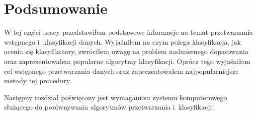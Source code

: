 \documentclass[../thesis.tex]{subfiles}
\begin{document}
\section{Podsumowanie}

W tej części pracy przedstawiłem podstawowe informacje na temat przetwarzania wstępnego i~klasyfikacji danych. Wyjaśniłem na czym polega klasyfikacja, jak ocenia się klasyfikatory, zwróciłem uwagę na problem nadmiernego dopasowania oraz zaprezentowałem popularne algorytmy klasyfikacji. Oprócz tego wyjaśniłem cel wstępnego przetwarzania danych oraz zaprezentowałem najpopularniejsze metody tej procedury.

Następny rozdział poświęcony jest wymaganiom systemu komputerowego służącego do porównywania algorytmów przetwarzania i~klasyfikacji.
\end{document}
